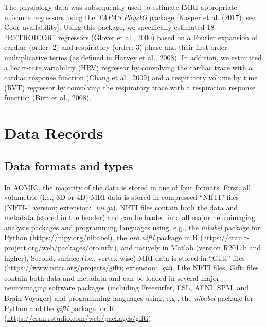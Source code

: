\documentclass[11pt,american,]{memoir} %
\begin{document}
The physiology data was subsequently used to estimate fMRI-appropriate nuisance regressors using the \emph{TAPAS PhysIO} package {[}Kasper et al. (\protect\hyperlink{ref-Kasper2017-lp}{2017}); see Code availability{]}. Using this package, we specifically estimated 18 ``RETROICOR'' regressors (Glover et al., \protect\hyperlink{ref-Glover2000-or}{2000}) based on a Fourier expansion of cardiac (order: 2) and respiratory (order: 3) phase and their first-order multiplicative terms (as defined in Harvey et al., \protect\hyperlink{ref-Harvey2008-nt}{2008}). In addition, we estimated a heart-rate variability (HRV) regressor by convolving the cardiac trace with a cardiac response function (Chang et al., \protect\hyperlink{ref-Chang2009-vu}{2009}) and a respiratory volume by time (RVT) regressor by convolving the respiratory trace with a respiration response function (Birn et al., \protect\hyperlink{ref-Birn2008-ti}{2008}).

\hypertarget{data-records}{%
\section{Data Records}\label{data-records}}

\hypertarget{data-formats-and-types}{%
\subsection{Data formats and types}\label{data-formats-and-types}}

In AOMIC, the majority of the data is stored in one of four formats. First, all volumetric (i.e., 3D or 4D) MRI data is stored in compressed ``NIfTI'' files (NIfTI-1 version; extension: \emph{.nii.gz}). NIfTI files contain both the data and metadata (stored in the header) and can be loaded into all major neuroimaging analysis packages and programming languages using, e.g., the \emph{nibabel} package for Python (\url{https://nipy.org/nibabel}), the \emph{oro.nifti} package in R (\url{https://cran.r-project.org/web/packages/oro.nifti}), and natively in Matlab (version R2017b and higher). Second, surface (i.e., vertex-wise) MRI data is stored in ``Gifti'' files (\url{https://www.nitrc.org/projects/gifti}; extension: \emph{.gii}). Like NIfTI files, Gifti files contain both data and metadata and can be loaded in several major neuroimaging software packages (including Freesurfer, FSL, AFNI, SPM, and Brain Voyager) and programming languages using, e.g., the \emph{nibabel} package for Python and the \emph{gifti} package for R (\url{https://cran.rstudio.com/web/packages/gifti}).
\end{document}
